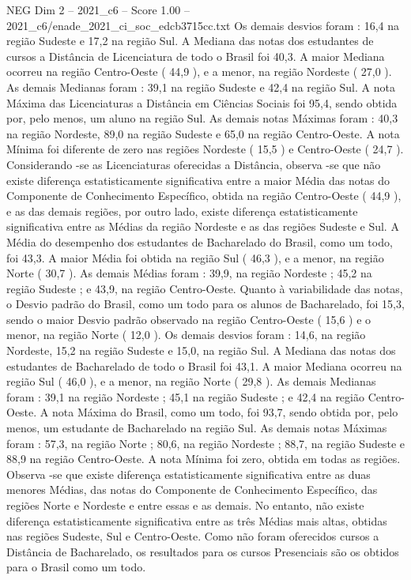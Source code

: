 \begin{textsample}{NEG Dim 2 – 2021\_c6 – Score 1.00 – 2021\_c6/enade\_2021\_ci\_soc\_edcb3715cc.txt}
Os demais desvios foram : 16,4 na região Sudeste e 17,2 na região Sul.
A Mediana das notas dos estudantes de cursos a Distância de Licenciatura de todo o Brasil foi 40,3.
A maior Mediana ocorreu na região Centro-Oeste ( 44,9 ), e a menor, na região Nordeste ( 27,0 ).
As demais Medianas foram : 39,1 na região Sudeste e 42,4 na região Sul.
A nota Máxima das Licenciaturas a Distância em Ciências Sociais foi 95,4, sendo obtida por, pelo menos, um aluno na região Sul.
As demais notas Máximas foram : 40,3 na região Nordeste, 89,0 na região Sudeste e 65,0 na região Centro-Oeste.
A nota Mínima foi diferente de zero nas regiões Nordeste ( 15,5 ) e Centro-Oeste ( 24,7 ).
Considerando -se as Licenciaturas oferecidas a Distância, observa -se que não existe diferença estatisticamente significativa entre a maior Média das notas do Componente de Conhecimento Específico, obtida na região Centro-Oeste ( 44,9 ), e as das demais regiões, por outro lado, existe diferença estatisticamente significativa entre as Médias da região Nordeste e as das regiões Sudeste e Sul.
A Média do desempenho dos estudantes de Bacharelado do Brasil, como um todo, foi 43,3.
A maior Média foi obtida na região Sul ( 46,3 ), e a menor, na região Norte ( 30,7 ).
As demais Médias foram : 39,9, na região Nordeste ; 45,2 na região Sudeste ; e 43,9, na região Centro-Oeste.
Quanto à variabilidade das notas, o Desvio padrão do Brasil, como um todo para os alunos de Bacharelado, foi 15,3, sendo o maior Desvio padrão observado na região Centro-Oeste ( 15,6 ) e o menor, na região Norte ( 12,0 ).
Os demais desvios foram : 14,6, na região Nordeste, 15,2 na região Sudeste e 15,0, na região Sul.
A Mediana das notas dos estudantes de Bacharelado de todo o Brasil foi 43,1.
A maior Mediana ocorreu na região Sul ( 46,0 ), e a menor, na região Norte ( 29,8 ).
As demais Medianas foram : 39,1 na região Nordeste ; 45,1 na região Sudeste ; e 42,4 na região Centro-Oeste.
A nota Máxima do Brasil, como um todo, foi 93,7, sendo obtida por, pelo menos, um estudante de Bacharelado na região Sul.
As demais notas Máximas foram : 57,3, na região Norte ; 80,6, na região Nordeste ; 88,7, na região Sudeste e 88,9 na região Centro-Oeste.
A nota Mínima foi zero, obtida em todas as regiões.
Observa -se que existe diferença estatisticamente significativa entre as duas menores Médias, das notas do Componente de Conhecimento Específico, das regiões Norte e Nordeste e entre essas e as demais.
No entanto, não existe diferença estatisticamente significativa entre as três Médias mais altas, obtidas nas regiões Sudeste, Sul e Centro-Oeste.
Como não foram oferecidos cursos a Distância de Bacharelado, os resultados para os cursos Presenciais são os obtidos para o Brasil como um todo.

\end{textsample}
